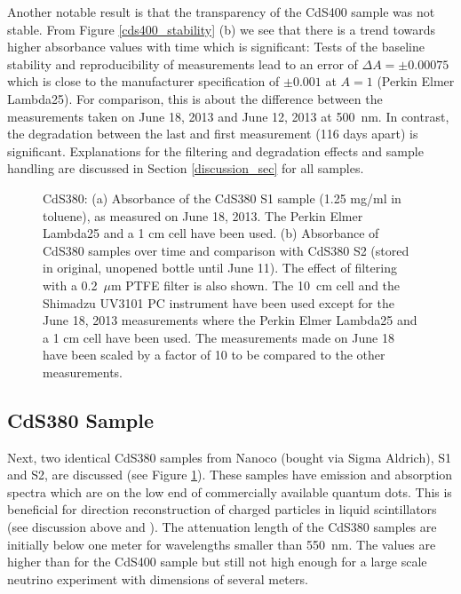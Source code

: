 \documentclass[cits]{JINST}
\begin{document}
Another notable result is that the transparency of the CdS400 sample was not stable. From Figure \ref{cds400_stability} (b) we see that there is a trend towards higher absorbance values with time which is significant: Tests of the baseline stability and reproducibility of measurements lead to an error of $\Delta A = \pm 0.00075$ which is close to the manufacturer specification of $\pm 0.001$ at $A=1$ (Perkin Elmer Lambda25). For comparison, this is about the difference between the measurements taken on June 18, 2013 and June 12, 2013 at 500~nm. In contrast, the degradation between the last and first measurement (116 days apart) is significant. Explanations for the filtering and degradation effects and sample handling are discussed in Section \ref{discussion_sec} for all samples.  

\begin{figure}
        \begin{center}
        \caption[]{CdS380: (a) Absorbance of the CdS380 S1 sample (1.25 mg/ml in toluene), as measured on June 18, 2013. The Perkin Elmer Lambda25 and a 1 cm cell have been used. (b) Absorbance of CdS380 samples over time and comparison with CdS380 S2 (stored in original, unopened bottle until June 11). The effect of filtering with a 0.2~$\mu$m PTFE filter is also shown. The 10~cm cell and the Shimadzu UV3101 PC instrument have been used except for the June 18, 2013 measurements where the Perkin Elmer Lambda25 and a 1 cm cell have been used. The measurements made on June 18 have been scaled by a factor of 10 to be compared to the other measurements. \label{cds380_stability}}
        \end{center}
\end{figure}

\subsection{CdS380 Sample}
Next, two identical CdS380 samples from Nanoco (bought via Sigma Aldrich), S1 and S2, are discussed (see Figure \ref{cds380_stability}). These samples have emission and absorption spectra which are on the low end of commercially available quantum dots. This is beneficial for direction reconstruction of charged particles in liquid scintillators (see discussion above and \cite{mitpaper,simpaper}). The attenuation length of the CdS380 samples are initially below one meter for wavelengths smaller than 550~nm. The values are higher than for the CdS400 sample but still not high enough for a large scale neutrino experiment with dimensions of several meters. 
\end{document}
